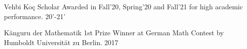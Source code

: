 
\begin{cvhonors}
  \cvhonor
    {Vehbi Koç Scholar}
    {Awarded in Fall’20, Spring’20 and Fall’21 for high academic performance.}
    {}
    {20’-21’}

  \cvhonor
    {Känguru der Mathematik}
    {1st Prize Winner at German Math Contest by Humboldt Universität zu Berlin.}
    {}
    {2017}

\end{cvhonors}
